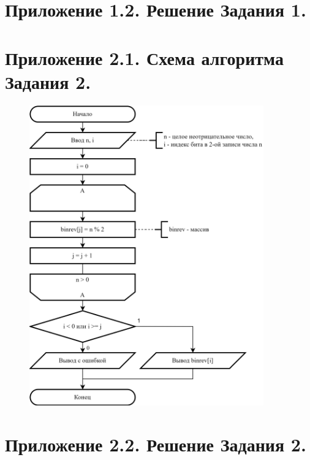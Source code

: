 \documentclass[oneside,a4paper,14pt]{extarticle} %
\begin{document}
\section*{Приложение 1.2. Решение Задания 1.}
\newpage
\section*{Приложение 2.1. Схема алгоритма Задания 2.}
\begin{figure}[h!]
	\centering
	\includegraphics[width=0.9\textwidth]{pics/2-flowchart.png}
\end{figure}
\newpage
\section*{Приложение 2.2. Решение Задания 2.}
\newpage
\end{document}
